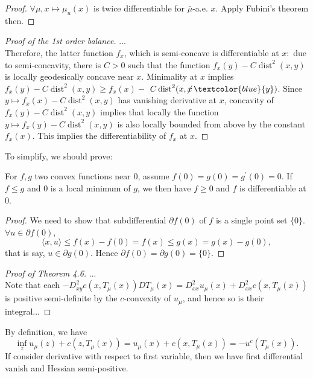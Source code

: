 \begin{proof}
	$\forall \mu, x \mapsto \mu_u(x)$ is twice differentiable for $\bar{\mu}$-a.e. $x$. Apply Fubini's theorem then.
\end{proof}

\begin{proof}[Proof of the 1st order balance]
	... \\
	Therefore, the latter function \( f _ { x } \), which is semi-concave is differentiable at \( x : \) due to semi-concavity, there is \( C > 0 \) such that the function \( f _ { x } ( y ) - C \operatorname { dist } ^ { 2 } ( x , y ) \) is locally geodesically concave near \( x \).
	Minimality at \( x \) implies \( f _ { x } ( y ) - C \operatorname { dist } ^ { 2 } ( x , y ) \geq f _ { x } ( x ) - \) \( C \operatorname { dist } ^ { 2 } ( x , \cancel{x}\, \textcolor{blue}{y} ) \).
	Since \( y \mapsto f _ { x } ( x ) - C \operatorname { dist } ^ { 2 } ( x , y ) \) has vanishing derivative at \( x \), concavity of \( f _ { x } ( y ) - C \operatorname { dist } ^ { 2 } ( x , y ) \) implies that locally the function \( y \mapsto f _ { x } ( y ) - C \operatorname { dist } ^ { 2 } ( x , y ) \) is also
	locally bounded from above by the constant \( f _ { x } ( x ) . \) This implies the differentiability of
	\( f _ { x } \) at \( x \).
\end{proof}

To simplify, we should prove:
\begin{lem}
	For $f, g$ two convex functions near $0$, assume $f(0)=g(0)=g^\prime(0)=0$. If $f \leq g$ and $0$ is a local minimum of $g$, we then have $f \geq 0$ and $f$ is differentiable at $0$.
\end{lem}

\begin{proof}
	We need to show that subdifferential $\partial f(0) $ of $f$ is a single point set $ \{ 0 \}$. $\forall u \in \partial f( 0 )$,
	\[
		\langle x, u \rangle \leq f(x) - f(0) = f(x) \leq g(x) = g(x) - g(0),
	\]
	that is say, $ u \in \partial g(0)$. Hence $ \partial f(0) = \partial g(0) = \{0\}$.

\end{proof}

\begin{proof}[Proof of Theorem 4.6]
	...\\
	Note that each \( - D _ { x y } ^ { 2 } c \left( x , T _ { \mu } ( x ) \right) D T _ { \mu } ( x ) = D _ { x x } ^ { 2 } u _ { \mu } ( x ) + D _ { x x } ^ { 2 } c \left( x , T _ { \mu } ( x ) \right) \) is positive semi-definite by the \( c \)-convexity of \( u _ { \mu } \), and hence so is their integral...
\end{proof}

By definition, we have
\[
	\inf_z u_\mu(z) + c(z, T_\mu(x))= u_\mu(x) + c(x, T_\mu(x)) = - u^c ( T_\mu(x)).
\]
If consider derivative with respect to first variable, then we have first differential vanish and Hessian semi-positive.
